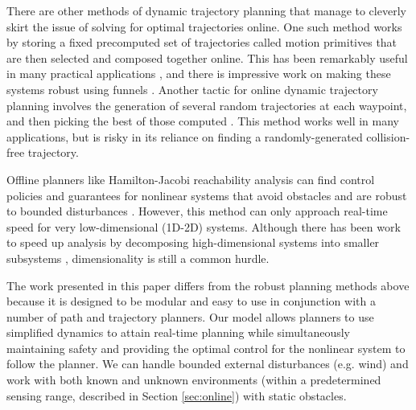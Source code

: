 There are other methods of dynamic trajectory planning that manage to cleverly skirt the issue of solving for optimal trajectories online.  One such method works by storing a fixed precomputed set of trajectories called motion primitives that are then selected and composed together online.  This has been remarkably useful in many practical applications \cite{Gillula2010, Dey2014, Barry2016}, and there is impressive work on making these systems robust using funnels \cite{Majumdar2016]}.  Another tactic for online dynamic trajectory planning involves the generation of several random trajectories at each waypoint, and then picking the best of those computed \cite{Kalakrishnan2011, Schwesinger2013, Krusi2015}.  This method works well in many applications, but is risky in its reliance on finding a randomly-generated collision-free trajectory.  

Offline planners like Hamilton-Jacobi reachability analysis can find control policies and guarantees for nonlinear systems that avoid obstacles and are robust to bounded disturbances \cite{Mitchell05}.  However, this method can only approach real-time speed for very low-dimensional (1D-2D) systems. Although there has been work to speed up analysis by decomposing high-dimensional systems into smaller subsystems \cite{Chen2016a, Chen2016b}, dimensionality is still a common hurdle.

The work presented in this paper differs from the robust planning methods above because it is designed to be modular and easy to use in conjunction with a number of path and trajectory planners.  Our model allows planners to use simplified dynamics to attain real-time planning while simultaneously maintaining safety and providing the optimal control for the nonlinear system to follow the planner. We can handle bounded external disturbances (e.g. wind) and work with both known and unknown environments (within a predetermined sensing range, described in Section \ref{sec:online}) with static obstacles. 